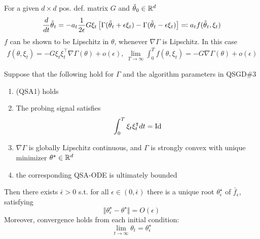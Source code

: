 For a given \(d\times d\) pos. def. matrix \(G\) and \({\tilde{\theta}}_0\in\mathbb{R}^d\)
\begin{align*}
    \frac{d}{dt}{\tilde{\theta}}_t=-a_t\frac{1}{2\epsilon} G\xi_t\left[\Gamma({\tilde{\theta}}_{t}+\epsilon\xi_t)-\Gamma({\tilde{\theta}}_t-\epsilon\xi_t)\right]\eqcolon a_t f({\tilde{\theta}}_t,\xi_t)
\end{align*}
\(f\) can be shown to be Lipschitz in \(\theta\), whenever \(\nabla\Gamma\) is Lipschitz. 
In this case 
\begin{align*}
    f(\theta,\xi_t)=-G \xi_t\xi_t^\intercal\nabla\Gamma(\theta)+o(\epsilon),\ \lim_{T\to\infty} \int_0^T f(\theta,\xi_t)=-G\nabla\Gamma(\theta)+o(\epsilon)
\end{align*} 
\begin{proposition}\label{prop:45}
    Suppose that the following hold for \(\Gamma\) and the 
    algorithm parameters in QSGD\#3
    \begin{enumerate}
        \item (QSA1) holds 
        \item The probing signal satisfies \[\int_0^T\xi_t\xi_t^\intercal dt=\text{Id}\]
        \item \(\nabla\Gamma\) is globally Lipschitz continuous, and \(\Gamma\) is strongly convex with unique minimizer \(\theta^\star\in\mathbb{R}^d\)
        \item the corresponding QSA-ODE is ultimately bounded
    \end{enumerate}
    Then there exists \(\bar{\epsilon}>0\) s.t. for all \(\epsilon\in (0,\bar{\epsilon})\) there is a 
    unique root \(\theta_\epsilon^\star\) of \(\bar{f}_\epsilon\), satisfying \[\Vert \theta_\epsilon^\star-\theta^\star\Vert=O(\epsilon)\]
    Moreover, convergence holds from each initial condition:
    \[\lim_{t\to\infty}\theta_t=\theta_\epsilon^\star\]
\end{proposition}
